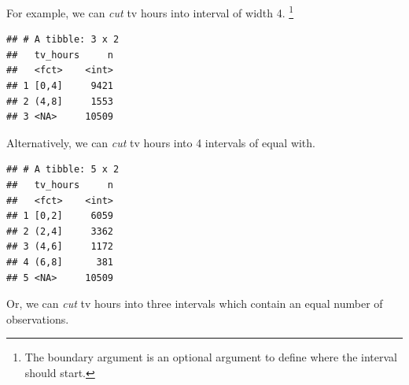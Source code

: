 \documentclass[]{tufte-book}
\newenvironment{Shaded}{}{}
\newcommand{\KeywordTok}[1]{\textcolor[rgb]{0.00,0.44,0.13}{\textbf{#1}}}
\newcommand{\DataTypeTok}[1]{\textcolor[rgb]{0.56,0.13,0.00}{#1}}
\newcommand{\DecValTok}[1]{\textcolor[rgb]{0.25,0.63,0.44}{#1}}
\newcommand{\StringTok}[1]{\textcolor[rgb]{0.25,0.44,0.63}{#1}}
\newcommand{\OperatorTok}[1]{\textcolor[rgb]{0.40,0.40,0.40}{#1}}
\newcommand{\NormalTok}[1]{#1}
\begin{document}
For example, we can \emph{cut} tv hours into interval of width 4.
\footnote{The boundary argument is an optional argument to define where
  the interval should start.}

\begin{Shaded}
\end{Shaded}

\begin{verbatim}
## # A tibble: 3 x 2
##   tv_hours     n
##   <fct>    <int>
## 1 [0,4]     9421
## 2 (4,8]     1553
## 3 <NA>     10509
\end{verbatim}

Alternatively, we can \emph{cut} tv hours into 4 intervals of equal
with.

\begin{Shaded}
\end{Shaded}

\begin{verbatim}
## # A tibble: 5 x 2
##   tv_hours     n
##   <fct>    <int>
## 1 [0,2]     6059
## 2 (2,4]     3362
## 3 (4,6]     1172
## 4 (6,8]      381
## 5 <NA>     10509
\end{verbatim}

Or, we can \emph{cut} tv hours into three intervals which contain an
equal number of observations.

\begin{Shaded}
\end{Shaded}
\end{document}
